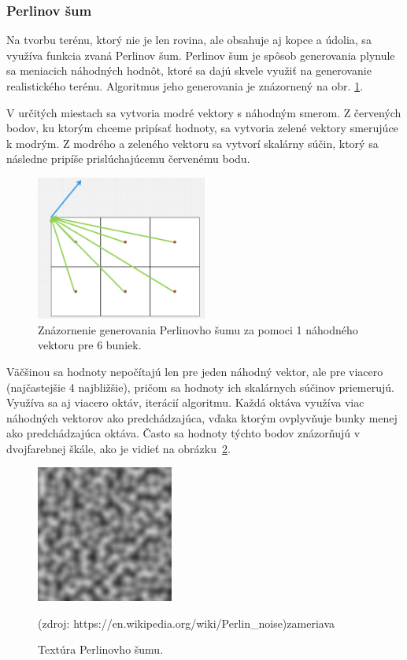 \documentclass[12pt]{article}
\begin{document}
\subsubsection{Perlinov šum}

Na tvorbu terénu, ktorý nie je len rovina, ale obsahuje aj kopce a údolia,
sa využíva funkcia zvaná Perlinov šum.
Perlinov šum je spôsob generovania plynule sa meniacich náhodných
hodnôt, ktoré sa dajú skvele využiť na generovanie realistického terénu.
Algoritmus jeho generovania je znázornený na obr. \ref{obr:perlinov sum}.

V určitých miestach sa vytvoria modré vektory s náhodným smerom.
Z červených bodov, ku ktorým chceme pripísať hodnoty,
sa vytvoria zelené vektory smerujúce k modrým.
Z modrého a zeleného vektoru sa vytvorí skalárny súčin, ktorý sa následne
pripíše prislúchajúcemu červenému bodu.

\begin{figure}[ht]
	\centering
	\captionsetup{justification=centering}
	\includegraphics[width=0.5\textwidth]{res/prelinov_sum.png}
	\caption{Znázornenie generovania Perlinovho šumu za pomoci 1 náhodného
		vektoru pre 6 buniek.}
	\label{obr:perlinov sum}
\end{figure}

Väčšinou sa hodnoty nepočítajú len pre jeden náhodný vektor,
ale pre viacero (najčastejšie 4 najbližšie), pričom sa hodnoty ich skalárnych
súčinov priemerujú. Využíva sa aj viacero oktáv, iterácií algoritmu.
Každá oktáva využíva viac náhodných vektorov ako predchádzajúca,
vďaka ktorým ovplyvňuje bunky menej ako predchádzajúca oktáva.
Často sa hodnoty týchto bodov znázorňujú v dvojfarebnej škále,
ako je vidieť na obrázku~\ref{obr:perlinov sum textura}.

\begin{figure}[ht]
	\centering
	\includegraphics[width=0.4\textwidth]{res/perlinov_sum_textura.png}
	\caption{Textúra Perlinovho šumu.}
	\footnotesize (zdroj: https://en.wikipedia.org/wiki/Perlin\_noise)zameriava 
	\label{obr:perlinov sum textura}
\end{figure}
\end{document}

